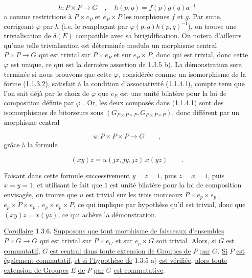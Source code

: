\begin{equation*}
h : P \times P \longrightarrow G \quad , \quad h(p,q) = f(p)g(q)a^{-1}
\end{equation*}
a comme restrictions à $P \times e_P$ et $e_P \times P$ les morphismes $f$ et $g$. Par suite, corrigeant $\varphi$ par $h$ (i.e. le remplaçant par $\varphi(p,q)h(p,q)^{-1}$), on trouve une trivialisation de $\delta(E)$ compatible avec sa birigidification. On notera d'ailleurs qu'une telle trivialisation est déterminée modulo un morphisme central $P \times P \longrightarrow G$ qui est trivial sur $P \times e_P$ et sur $e_P \times P$, donc qui est trivial, donc cette $\varphi$ est unique, ce qui est la dernière assertion de 1.3.5 b). La démonstration sera terminée si nous prouvons que cette $\varphi$, considérée comme un isomorphisme de la forme (1.1.3.2), satisfait à la condition d'associativité (1.1.4.1), compte tenu que l'on sait déjà par le choix de $\varphi$ que $e_E$ est une unité bilatère pour la loi de composition définie par $\varphi$ . Or, les deux composés dans (1.1.4.1) sont des isomorphismes de bitorseurs sous $(G_{P \times P \times P} , G_{P \times P \times P})$, donc différent par un morphisme central

\begin{equation*}
u : P \times P \times P \longrightarrow G \qquad ,
\end{equation*}
grâce à la formule

\begin{equation*}
(xy)z = u(jx,jy,jz) \ x(yz) \qquad .
\end{equation*}


Faisant  dans cette formule successivement $y=z=1$, puis $z=x=1$, puis $x=y=1$, et utilisant le fait que $1$ est unité bilatère pour la loi de composition envisagée, on trouve que $u$ est trivial sur les trois morceaux $P\times e_p\times e_p$ , $e_p\times P\times e_p$ , $e_p\times e_p\times P$, ce qui implique par hypothèse qu'il est trivial, donc que $(xy)z = x(yz)$, ce qui achève la démonstration.

\underline{Corollaire} 1.3.6. \underline{Supposons que tout morphisme de faisceaux d'ensembles} $P\times G \longrightarrow G$ \underline{qui est trivial sur} $P\times e_G$ \underline{et sur} $e_p\times G$ \underline{soit trivial}. \underline{Alors}, \underline{si} $G$ \underline{est commutatif}, $G$ \underline{est central dans toute extension de Groupes de} $P$ \underline{par} $G$. \underline{Si} $P$ \underline{est également commutatif}, \underline{et si l'hypothèse de} 1.3.5 a) \underline{est vérifiée}, \underline{alors toute extension de Groupes} $E$ \underline{de} $P$ \underline{par} $G$ \underline{est commutative}.

